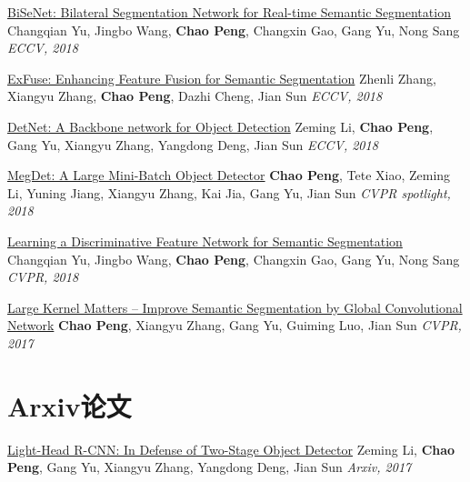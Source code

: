 \documentclass[]{friggeri-cv}
\begin{document}
\href{https://arxiv.org/pdf/1808.00897.pdf}{BiSeNet: Bilateral Segmentation Network for Real-time Semantic Segmentation}\newline
Changqian Yu, Jingbo Wang, \textbf{Chao Peng}, Changxin Gao, Gang Yu, Nong Sang\newline
\emph{ECCV, 2018}

\href{https://arxiv.org/pdf/1804.03821.pdf}{ExFuse: Enhancing Feature Fusion for Semantic Segmentation}\newline
Zhenli Zhang, Xiangyu Zhang, \textbf{Chao Peng}, Dazhi Cheng, Jian Sun\newline
\emph{ECCV, 2018}

\href{https://arxiv.org/pdf/1804.06215.pdf}{DetNet: A Backbone network for Object Detection} \newline
Zeming Li, \textbf{Chao Peng}, Gang Yu, Xiangyu Zhang, Yangdong Deng, Jian Sun  \newline
\emph{ECCV, 2018}

\href{https://arxiv.org/pdf/1711.07240.pdf}{MegDet: A Large Mini-Batch Object Detector\qquad } \newline
\textbf{Chao Peng}, Tete Xiao, Zeming Li, Yuning Jiang, Xiangyu Zhang, Kai Jia, Gang Yu, \newline
Jian Sun \newline
\emph{CVPR spotlight, 2018}

\href{https://arxiv.org/pdf/1804.09337.pdf}{Learning a Discriminative Feature Network for Semantic Segmentation}\newline
Changqian Yu, Jingbo Wang, \textbf{Chao Peng}, Changxin Gao, Gang Yu, Nong Sang
\newline
\emph{CVPR, 2018}

\href{https://arxiv.org/pdf/1703.02719.pdf}{Large Kernel Matters -- Improve Semantic Segmentation by Global Convolutional Network}
\textbf{Chao Peng}, Xiangyu Zhang, Gang Yu, Guiming Luo, Jian Sun \newline
\emph{CVPR, 2017}

\section{Arxiv论文}
\href{https://arxiv.org/pdf/1711.07264.pdf}{Light-Head R-CNN: In Defense of Two-Stage Object Detector} \newline
Zeming Li, \textbf{Chao Peng}, Gang Yu, Xiangyu Zhang, Yangdong Deng, Jian Sun  \newline
\emph{Arxiv, 2017}
\end{document}
